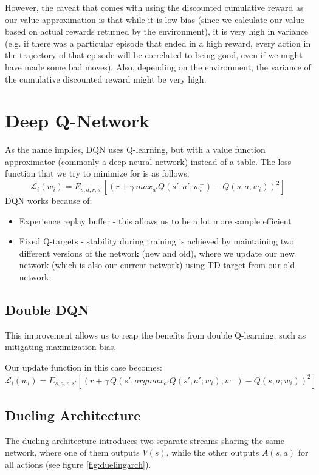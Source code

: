 \documentclass[12pt]{article} %
\begin{document}
However, the caveat that comes with using the discounted cumulative reward as our value approximation is that while it is low bias (since we calculate our value based on actual rewards returned by the environment), it is very high in variance (e.g. if there was a particular episode that ended in a high reward, every action in the trajectory of that episode will be correlated to being good, even if we might have made some bad moves). Also, depending on the environment, the variance of the cumulative discounted reward might be very high.  

\section{Deep Q-Network}
As the name implies, DQN uses Q-learning, but with a value function approximator (commonly a deep neural network) instead of a table. The loss function that we try to minimize for is as follows:
\begin{equation*}
    \mathcal{L}_i(w_i) = E_{s, a, r, s'}[(r + \gamma\,max_{a'}Q(s', a'; w_i^-) - Q(s, a; w_i))^2]
\end{equation*}
DQN works because of:
\begin{itemize}
    \item Experience replay buffer - this allows us to be a lot more sample efficient 
    \item Fixed Q-targets - stability during training is achieved by maintaining two different versions of the network (new and old), where we update our new network (which is also our current network) using TD target from our old network. 
\end{itemize}
\subsection{Double DQN}
This improvement allows us to reap the benefits from double Q-learning, such as mitigating maximization bias.

Our update function in this case becomes:
\begin{equation*}
    \mathcal{L}_i(w_i) = E_{s, a, r, s'}[(r + \gamma\,Q(s', argmax_{a'}Q(s', a'; w_i); w^-) - Q(s, a; w_i))^2]
\end{equation*}

\subsection{Dueling Architecture}
The dueling architecture introduces two separate streams sharing the same network, where one of them outputs $V(s)$, while the other outputs $A(s,a)$ for all actions (see figure \ref{fig:duelingarch}).
\end{document}
